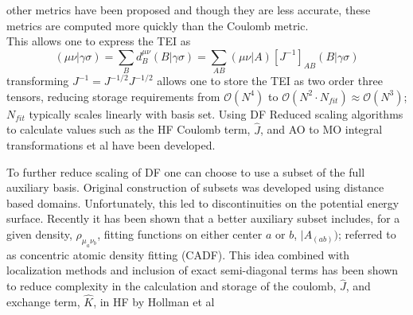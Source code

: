 		other metrics have been proposed\cite{Baerends1973} and though they are less accurate, these metrics are computed more quickly than the Coulomb metric.\\
		This allows one to express the TEI as 
			\begin{equation}
				(\mu\nu|\gamma\sigma) = \sum_B d^{\mu\nu}_B (B|\gamma\sigma) = \sum_{AB} (\mu\nu|A)[J^{-1}]_{AB}(B|\gamma\sigma)
			\end{equation}
		transforming $J^{-1} = J^{-1/2}J^{-1/2}$ allows one to store the TEI as two order three tensors, reducing storage requirements from $\mathcal{O}(N^4)$ to $\mathcal{O}(N^2\cdot N_{fit}) \approx \mathcal{O}(N^3)$; $N_{fit}$ typically scales linearly with basis set. Using DF Reduced scaling algorithms to calculate values such as the HF Coulomb term, $\hat{J}$, and AO to MO integral transformations et al have been developed.  %
		
		To further reduce %
		scaling of DF one can choose to use a subset of the full auxiliary basis. Original construction of subsets was developed using distance based domains. Unfortunately, this led to discontinuities on the potential energy surface. Recently it has been shown that a better auxiliary subset includes, for a given density, $\rho_{\mu_a\nu_b}$, fitting functions on either center $a$ or $b$, $|A_{(ab)})$; %
		referred to as concentric atomic density fitting (CADF). This idea combined with localization methods and inclusion of exact semi-diagonal terms has been shown to reduce complexity in the calculation and storage of the coulomb, $\hat{J}$, and exchange term, $\hat{K}$, in HF by Hollman et al\cite{Hollman2014}
